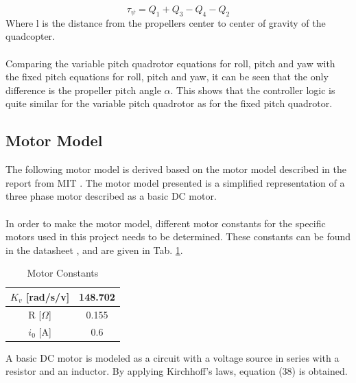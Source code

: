 \begin{equation}
   \tau_\psi = Q_1 + Q_3 - Q_4 - Q_2
\end{equation}
Where l is the distance from the propellers center to center of gravity of the quadcopter.
\\\\
Comparing the variable pitch quadrotor equations for roll, pitch and yaw with the fixed pitch equations for roll, pitch and yaw, it can be seen that the only difference is the propeller pitch angle $\alpha$. This shows that the controller logic is quite similar for the variable pitch quadrotor as for the fixed pitch quadrotor.
\newpage

\subsection{Motor Model}
The following motor model is derived based on the motor model described in the report from MIT \cite{MITvpp}. The motor model presented is a simplified representation of a three phase motor described as a basic DC motor. %
\\\\
In order to make the motor model, different motor constants for the specific motors used in this project needs to be determined. These constants can be found in the datasheet \cite{AXI}, and are given in Tab. \ref{tab:motconst}.

\begin{table}[H]
\centering
\caption{Motor Constants}
\label{tab:motconst}
\begin{tabular}{ |c|c| } 
 \hline
 $K_v$ [rad/s/v] & 148.702 \\ 
 \hline
 R [$\Omega$] & 0.155 \\ 
 \hline
 $i_0$ [A] & 0.6 \\ 
 \hline
\end{tabular}
\end{table}
\noindent
A basic DC motor is modeled as a circuit with a voltage source in series with a resistor and an inductor. By applying Kirchhoff's laws, equation (38) is obtained. 

